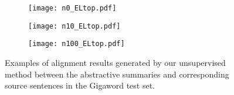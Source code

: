 \documentclass[11pt,a4paper]{article}
\begin{document}
\begin{figure}[t!]
    \centering
    \begin{subfigure}[t]{0.5\textwidth}
    \texttt{[image: n0\_ELtop.pdf]}
    \end{subfigure}
    \begin{subfigure}[t]{0.5\textwidth}
    \texttt{[image: n10\_ELtop.pdf]}
    \end{subfigure}
    \begin{subfigure}[t]{0.5\textwidth}
    \texttt{[image: n100\_ELtop.pdf]}
    \end{subfigure}
\caption{Examples of alignment results generated by our unsupervised method between the abstractive summaries and corresponding source sentences in the Gigaword test set.}
    \label{fig:alignment}
\end{figure}














\end{document}
